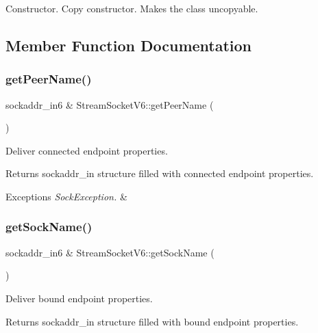 Constructor. Copy constructor. Makes the class uncopyable. 

\subsection{Member Function Documentation}
\mbox{\label{classStreamSocketV6_a8ebf6f50686e62c8aa080a2a47d4f82e}} 
\subsubsection{\texorpdfstring{get\+Peer\+Name()}{getPeerName()}}
{\footnotesize\ttfamily sockaddr\+\_\+in6 \& Stream\+Socket\+V6\+::get\+Peer\+Name (\begin{DoxyParamCaption}{ }\end{DoxyParamCaption})}

Deliver connected endpoint properties. \begin{DoxyReturn}{Returns}
sockaddr\+\_\+in structure filled with connected endpoint properties. 
\end{DoxyReturn}

\begin{DoxyExceptions}{Exceptions}
{\em Sock\+Exception.} & \\
\hline
\end{DoxyExceptions}
\mbox{\label{classStreamSocketV6_a93f4d15bfc95c567da19372d18e44cf1}} 
\subsubsection{\texorpdfstring{get\+Sock\+Name()}{getSockName()}}
{\footnotesize\ttfamily sockaddr\+\_\+in6 \& Stream\+Socket\+V6\+::get\+Sock\+Name (\begin{DoxyParamCaption}{ }\end{DoxyParamCaption})}

Deliver bound endpoint properties. \begin{DoxyReturn}{Returns}
sockaddr\+\_\+in structure filled with bound endpoint properties. 
\end{DoxyReturn}

